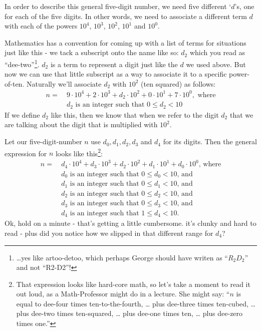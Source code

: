 \documentclass{article}
\begin{document}
In order to describe this general five-digit number, we need
five different `$d$'s, one for each of the five digits.
In other words, we need to associate a different term $d$ with each of the powers
$10^4$, $10^3$, $10^2$, $10^1$ and $10^0$.

Mathematics has a convention for coming up with
a list of terms for situations just like this -
we tack a subscript onto the name like so: $d_2$ which
you read as ``dee-two''\footnote{\dots{}yes like artoo-detoo, which perhaps
George should have writen as ``$R_2D_2$'' and not ``R2-D2''!}.
$d_2$ is a term to represent a digit just like the $d$ we used above.
But now we can use that little subscript as a way to
associate it to a specific power-of-ten.
Naturally we'll associate $d_2$ with $10^2$ (ten squared) as follows:
\begin{align*}
n =\ &9{\cdot}10^4+2{\cdot}10^3+d_2{\cdot}10^2+0{\cdot}10^1+7{\cdot}10^0,\text{ where}\\
&d_2\text{ is an integer such that }0\le{}d_2<10
\end{align*}
If we define $d_2$ like this, then we know that when we refer to the digit $d_2$
that we are talking about the digit that is multiplied with $10^2$.

\break
Let our five-digit-number $n$ use $d_0,d_1,d_2,d_3$ and $d_4$ for its digits. Then
the general expression for $n$ looks like this\footnote{That expression looks like
hard-core math, so let's take a moment
to read it out loud, as a Math-Professor might do in a lecture.  She might say:
``$n$ is equal to dee-four times ten-to-the-fourth, \dots{}
plus dee-three times ten-cubed, \dots{} plus dee-two times ten-squared,
  \dots{} plus dee-one times ten,  \dots{} plus dee-zero times one.''}:
\begin{align*}
n =\ &d_4{\cdot}10^4+d_3{\cdot}10^3+d_2{\cdot}10^2+d_1{\cdot}10^1+d_0{\cdot}10^0\text{, where}\\
& d_0\text{ is an integer such that }0\le{}d_0<10\text{, and}\\
& d_1\text{ is an integer such that }0\le{}d_1<10\text{, and}\\
& d_2\text{ is an integer such that }0\le{}d_2<10\text{, and}\\
& d_3\text{ is an integer such that }0\le{}d_3<10\text{, and}\\
& d_4\text{ is an integer such that }1\le{}d_4<10.
\end{align*}
Ok, hold on a minute - that's getting a little cumbersome. it's clunky and hard to read -
plus did  you notice how we slipped in that different range for $d_4$?
\end{document}
